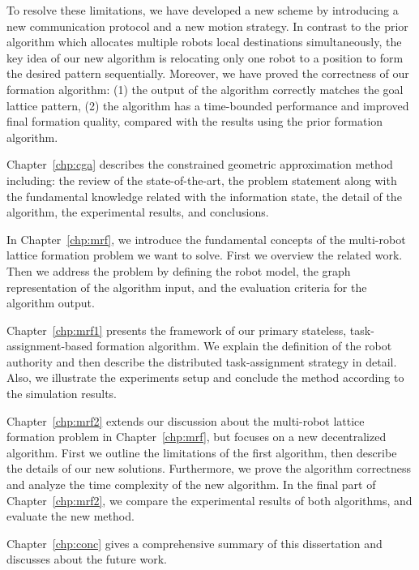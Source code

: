 To resolve these limitations, we have developed a new scheme by introducing a new communication protocol and a new motion strategy. 
In contrast to the prior algorithm which allocates multiple robots local destinations simultaneously,
the key idea of our new algorithm is relocating only one robot to a position to form the desired pattern sequentially.
Moreover, we have proved the correctness of our formation algorithm: (1) the
output of the algorithm correctly matches the goal lattice pattern, (2) the
algorithm has a time-bounded performance and improved final formation quality, 
compared with the results using the prior formation algorithm.

Chapter~\ref{chp:cga} describes the constrained geometric approximation method 
including: the review of the state-of-the-art,
the problem statement along with the fundamental knowledge related with the
information state, the detail of the algorithm, the experimental results, and conclusions.

In Chapter~\ref{chp:mrf}, we introduce the fundamental concepts of the multi-robot lattice formation problem we want to solve. 
% 
First we overview the related work. 
%
Then we address the problem by defining the robot model, the graph representation of the algorithm input, and the evaluation criteria for the algorithm output. 

Chapter~\ref{chp:mrf1} presents the framework of our primary stateless, task-assignment-based formation algorithm. 
%
We explain the definition of the robot authority and then describe the distributed task-assignment strategy in detail.
%
Also, we illustrate the experiments setup and conclude the method according to the simulation results.

Chapter~\ref{chp:mrf2} extends our discussion about the multi-robot lattice formation problem in Chapter~\ref{chp:mrf}, but focuses on a new decentralized algorithm. 
First we outline the limitations of the first algorithm, then describe the details of our new solutions.
Furthermore, we prove the algorithm correctness and analyze the time complexity of the new algorithm.
In the final part of Chapter~\ref{chp:mrf2}, we compare the experimental results of both algorithms, and evaluate the new method.

Chapter~\ref{chp:conc} gives a comprehensive summary of this dissertation and discusses about the future work.
